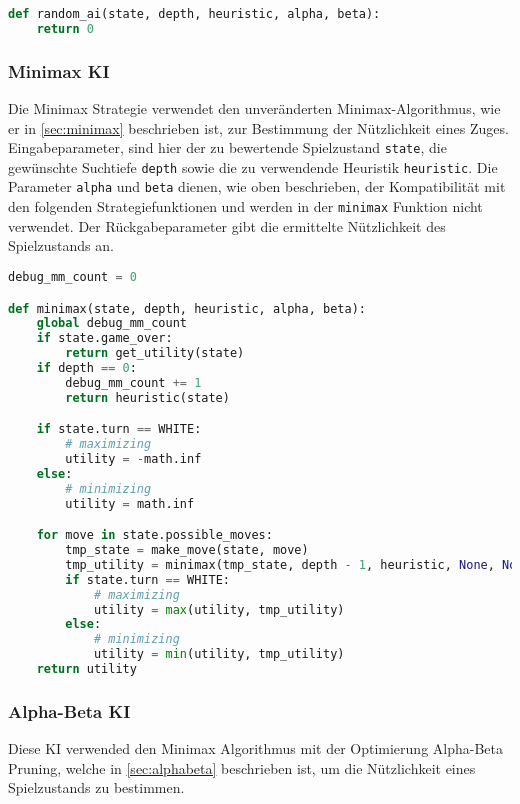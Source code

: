 \begin{lstlisting}[language=Python]
def random_ai(state, depth, heuristic, alpha, beta):
    return 0
\end{lstlisting}

\hypertarget{minimax-ki}{%
\subsubsection{Minimax KI}\label{minimax-ki}}

Die Minimax Strategie verwendet den unveränderten Minimax-Algorithmus,
wie er in \autoref{sec:minimax} beschrieben ist, zur Bestimmung der
Nützlichkeit eines Zuges. Eingabeparameter, sind hier der zu bewertende
Spielzustand \passthrough{\lstinline!state!}, die gewünschte Suchtiefe
\passthrough{\lstinline!depth!} sowie die zu verwendende Heuristik
\passthrough{\lstinline!heuristic!}. Die Parameter
\passthrough{\lstinline!alpha!} und \passthrough{\lstinline!beta!}
dienen, wie oben beschrieben, der Kompatibilität mit den folgenden
Strategiefunktionen und werden in der \passthrough{\lstinline!minimax!}
Funktion nicht verwendet. Der Rückgabeparameter gibt die ermittelte
Nützlichkeit des Spielzustands an.

\begin{lstlisting}[language=Python]
debug_mm_count = 0

def minimax(state, depth, heuristic, alpha, beta):
    global debug_mm_count
    if state.game_over:
        return get_utility(state)
    if depth == 0:
        debug_mm_count += 1
        return heuristic(state)

    if state.turn == WHITE:
        # maximizing
        utility = -math.inf
    else:
        # minimizing
        utility = math.inf

    for move in state.possible_moves:
        tmp_state = make_move(state, move)
        tmp_utility = minimax(tmp_state, depth - 1, heuristic, None, None)
        if state.turn == WHITE:
            # maximizing
            utility = max(utility, tmp_utility)
        else:
            # minimizing
            utility = min(utility, tmp_utility)
    return utility
\end{lstlisting}

\hypertarget{alpha-beta-ki}{%
\subsubsection{Alpha-Beta KI}\label{alpha-beta-ki}}

Diese \ac{KI} verwended den Minimax Algorithmus mit der Optimierung
Alpha-Beta Pruning, welche in \autoref{sec:alphabeta} beschrieben ist,
um die Nützlichkeit eines Spielzustands zu bestimmen.

